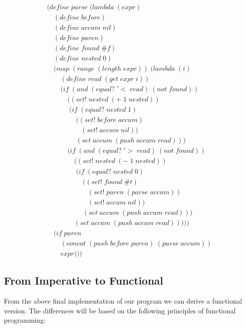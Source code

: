 \begin{figure}[htp]
\footnotesize
\caption{}\label{fig:fullImperParser}
\begin{align*}
& (define \; parse \; (lambda \; (expr) \; 
\\& \quad (define \; before)
\\& \quad (define \; accum \; nil)
\\& \quad (define \; paren)
\\& \quad (define \; found \; \#f)
\\& \quad (define \; nested \; 0)
\\& \quad (map \; (range \; (length \; expr)) \; (lambda \; (i)
\\& \qquad (define \; read \; (get \; expr \; i))
\\& \qquad (if \; (and \; (equal? \; '< \; read) \; (not \; found))
\\& \qquad \quad ((set! \; nested \; (+ \; 1 \; nested))
\\& \qquad \quad \; (if \; (equal? \; nested \; 1)
\\& \qquad \qquad \; ((set! \; before \; accum)
\\& \qquad \qquad \quad (set! \; accum \; nil))
\\& \qquad \qquad \; (set \; accum \; (push \; accum \; read)))
\\& \qquad \quad (if \; (and \; (equal? \; '> \; read) \; (not \; found))
\\& \qquad \qquad ((set! \; nested \; (- \; 1 \; nested))
\\& \qquad \qquad \; (if \; (equal? \; nested \; 0)
\\& \qquad \qquad \quad \; ((set! \; found \; \#t)
\\& \qquad \qquad \qquad (set! \; paren \; (parse \; accum))
\\& \qquad \qquad \qquad (set! \; accum \; nil))
\\& \qquad \qquad \quad \; (set \; accum \; (push \; accum \; read)))
\\& \qquad \qquad (set \; accum \; (push \; accum \; read)))))
\\& \quad (if \; paren
\\& \qquad (concat \; (push \; before \; paren) \; (parse \; accum))
\\& \qquad expr)))
\end{align*}
\end{figure}

\subsection{From Imperative to Functional}
From the above final implementation of our program we can derive a functional 
version. The differences will be based on the following principles of functional 
programming:

